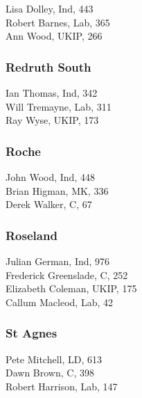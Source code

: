 \documentclass[a4paper,openany,10pt]{book}
\begin{document}


Lisa Dolley, Ind, 443\\
Robert Barnes, Lab, 365\\
Ann Wood, UKIP, 266\\


\subsubsection*{Redruth South}



Ian Thomas, Ind, 342\\
Will Tremayne, Lab, 311\\
Ray Wyse, UKIP, 173\\


\subsubsection*{Roche}



John Wood, Ind, 448\\
Brian Higman, MK, 336\\
Derek Walker, C, 67\\


\subsubsection*{Roseland}



Julian German, Ind, 976\\
Frederick Greenslade, C, 252\\
Elizabeth Coleman, UKIP, 175\\
Callum Macleod, Lab, 42\\


\subsubsection*{St Agnes}



Pete Mitchell, LD, 613\\
Dawn Brown, C, 398\\
Robert Harrison, Lab, 147\\
\end{document}
